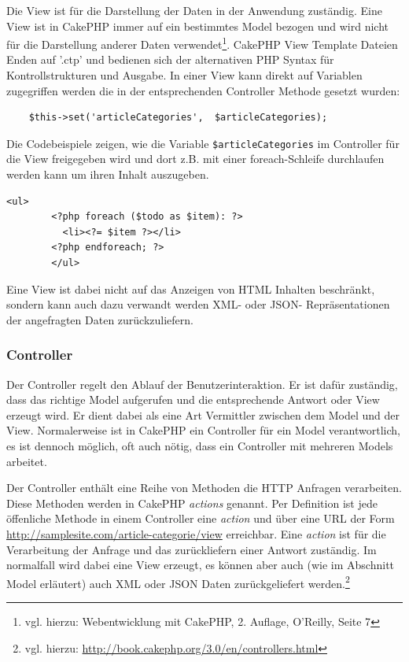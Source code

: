 	Die View ist für die Darstellung der Daten in der Anwendung zuständig. Eine View ist in CakePHP immer auf ein bestimmtes Model bezogen und wird nicht für die Darstellung anderer Daten verwendet\footnote{vgl. hierzu: Webentwicklung mit CakePHP, 2. Auflage, O'Reilly, Seite 7}. CakePHP View Template Dateien Enden auf '.ctp' und bedienen sich der alternativen PHP Syntax für Kontrollstrukturen und Ausgabe. 
	In einer View kann direkt auf Variablen zugegriffen werden die in der entsprechenden Controller Methode gesetzt wurden:\\ 
   \lstset{language=PHP} 
	\begin{lstlisting}
	$this->set('articleCategories',  $articleCategories);
	\end{lstlisting}
	  Die Codebeispiele zeigen, wie die Variable \texttt{\$articleCategories} im Controller für die View freigegeben wird und dort z.B. mit einer foreach-Schleife durchlaufen werden kann um ihren Inhalt auszugeben. 
		\lstset{language=PHP}
		\begin{lstlisting}[caption={Alternative PHP Syntax}] 	
		<ul>
	   	<?php foreach ($todo as $item): ?>
		  <li><?= $item ?></li>
		<?php endforeach; ?>
		</ul>
		\end{lstlisting}
	 Eine View ist dabei nicht auf das Anzeigen von HTML Inhalten beschränkt, sondern kann auch dazu verwandt werden XML- oder JSON- Repräsentationen der angefragten Daten zurückzuliefern.
	\subsubsection{Controller}
	Der Controller regelt den Ablauf der Benutzerinteraktion.
	Er ist dafür zuständig, dass das richtige Model aufgerufen und die entsprechende Antwort oder View erzeugt wird. Er dient dabei als eine Art Vermittler zwischen dem Model und der View. Normalerweise ist in CakePHP ein Controller für ein Model verantwortlich, es ist dennoch möglich, oft auch nötig, dass ein Controller mit mehreren Models arbeitet.
	
	Der Controller enthält eine Reihe von  Methoden die HTTP Anfragen verarbeiten. Diese Methoden werden in CakePHP \textit{actions} genannt. Per Definition ist jede öffenliche Methode in einem Controller eine \textit{action} und über eine URL der Form \url{http://samplesite.com/article-categorie/view} erreichbar.
	Eine \textit{action} ist für die Verarbeitung der Anfrage und das zurückliefern einer Antwort zuständig. Im normalfall wird dabei eine View erzeugt, es können aber auch (wie im Abschnitt Model erläutert) auch XML oder JSON Daten zurückgeliefert werden.\footnote{vgl. hierzu: \url{http://book.cakephp.org/3.0/en/controllers.html}}
	
